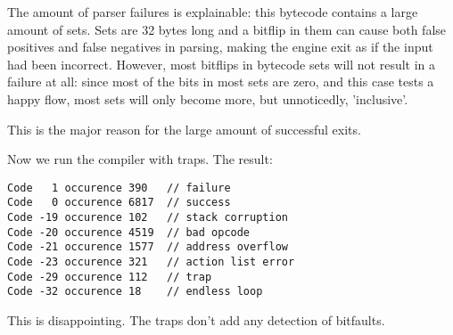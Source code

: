 The amount of parser failures is explainable: this bytecode contains
a large amount of sets. Sets are 32 bytes long and a bitflip in them
can cause both false positives and false negatives in parsing, making
the engine exit as if the input had been incorrect. However, most bitflips
in bytecode sets will not result in a failure at all: since most of the
bits in most sets are zero, and this case tests a happy flow, most sets
will only become more, but unnoticedly, 'inclusive'.

This is the major reason for the large amount of successful exits.

Now we run the compiler with traps. The result:

\begin{myquote}
\begin{verbatim}
Code   1 occurence 390   // failure
Code   0 occurence 6817  // success
Code -19 occurence 102   // stack corruption
Code -20 occurence 4519  // bad opcode
Code -21 occurence 1577  // address overflow
Code -23 occurence 321   // action list error
Code -29 occurence 112   // trap
Code -32 occurence 18    // endless loop

\end{verbatim}
\end{myquote}

This is disappointing. The traps don't add any detection of bitfaults.
